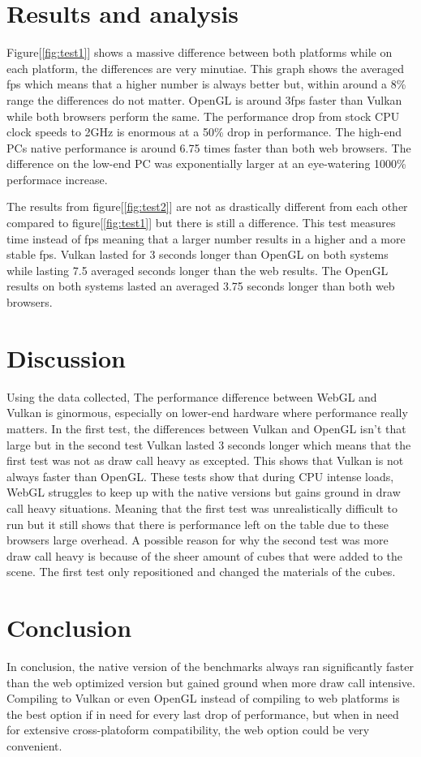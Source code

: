 \documentclass{article}
\begin{document}
\section {Results and analysis}
Figure[\ref{fig:test1}] shows a massive difference between both platforms while on each platform, the differences are very minutiae. This graph shows the averaged fps which means that a higher number is always better but, within around a 8\% range the differences do not matter. OpenGL is around 3fps faster than Vulkan while both browsers perform the same. The performance drop from stock CPU clock speeds to 2GHz is enormous at a 50\% drop in performance. The high-end PCs native performance is around 6.75 times faster than both web browsers. The difference on the low-end PC was exponentially larger at an eye-watering 1000\% performace increase.

The results from figure[\ref{fig:test2}] are not as drastically different from each other compared to figure[\ref{fig:test1}] but there is still a difference. This test measures time instead of fps meaning that a larger number results in a higher and a more stable fps. Vulkan lasted for 3 seconds longer than OpenGL on both systems while lasting 7.5 averaged seconds longer than the web results. The OpenGL results on both systems lasted an averaged 3.75 seconds longer than both web browsers.

\section {Discussion}
Using the data collected, The performance difference between WebGL and Vulkan is ginormous, especially on lower-end hardware where performance really matters. In the first test, the differences between Vulkan and OpenGL isn't that large but in the second test Vulkan lasted 3 seconds longer which means that the first test was not as draw call heavy as excepted. This shows that Vulkan is not always faster than OpenGL. These tests show that during CPU intense loads, WebGL struggles to keep up with the native versions but gains ground in draw call heavy situations. Meaning that the first test was unrealistically difficult to run but it still shows that there is performance left on the table due to these browsers large overhead. A possible reason for why the second test was more draw call heavy is because of the sheer amount of cubes that were added to the scene. The first test only repositioned and changed the materials of the cubes.

\section {Conclusion}
In conclusion, the native version of the benchmarks always ran significantly faster than the web optimized version but gained ground when more draw call intensive. Compiling to Vulkan or even OpenGL instead of compiling to web platforms is the best option if in need for every last drop of performance, but when in need for extensive cross-platoform compatibility, the web option could be very convenient.
\end{document}
